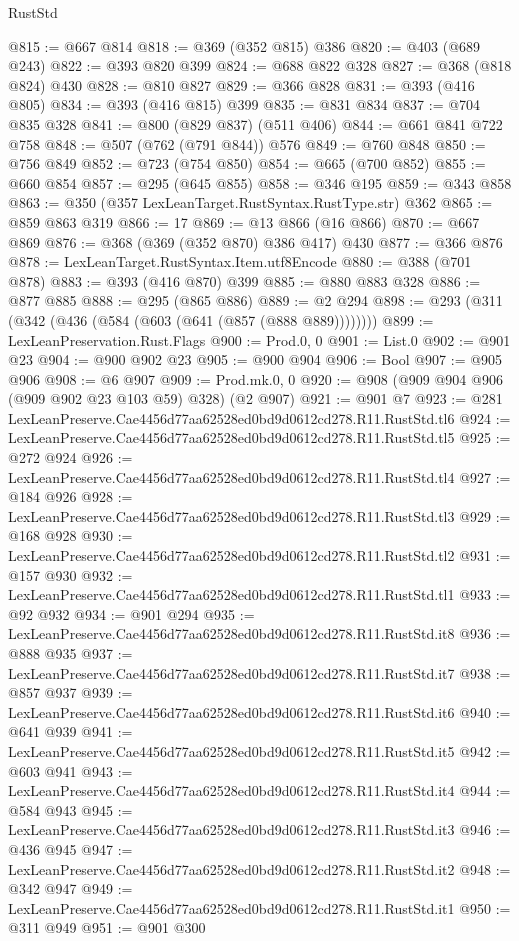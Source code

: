 \begin{lexlean}{RustStd}
\begin{coremodule}
@815 := @667 @814
@818 := @369 (@352 @815) @386
@820 := @403 (@689 @243)
@822 := @393 @820 @399
@824 := @688 @822 @328
@827 := @368 (@818 @824) @430
@828 := @810 @827
@829 := @366 @828
@831 := @393 (@416 @805)
@834 := @393 (@416 @815) @399
@835 := @831 @834
@837 := @704 @835 @328
@841 := @800 (@829 @837) (@511 @406)
@844 := @661 @841 @722 @758
@848 := @507 (@762 (@791 @844)) @576
@849 := @760 @848
@850 := @756 @849
@852 := @723 (@754 @850)
@854 := @665 (@700 @852)
@855 := @660 @854
@857 := @295 (@645 @855)
@858 := @346 @195
@859 := @343 @858
@863 := @350 (@357 LexLeanTarget.RustSyntax.RustType.str) @362
@865 := @859 @863 @319
@866 := 17
@869 := @13 @866 (@16 @866)
@870 := @667 @869
@876 := @368 (@369 (@352 @870) @386 @417) @430
@877 := @366 @876
@878 := LexLeanTarget.RustSyntax.Item.utf8Encode
@880 := @388 (@701 @878)
@883 := @393 (@416 @870) @399
@885 := @880 @883 @328
@886 := @877 @885
@888 := @295 (@865 @886)
@889 := @2 @294
@898 := @293 (@311 (@342 (@436 (@584 (@603 (@641 (@857 (@888 @889))))))))
@899 := LexLeanPreservation.Rust.Flags
@900 := Prod.{0, 0}
@901 := List.{0}
@902 := @901 @23
@904 := @900 @902 @23
@905 := @900 @904
@906 := Bool
@907 := @905 @906
@908 := @6 @907
@909 := Prod.mk.{0, 0}
@920 := @908 (@909 @904 @906 (@909 @902 @23 @103 @59) @328) (@2 @907)
@921 := @901 @7
@923 := @281 LexLeanPreserve.Cae4456d77aa62528ed0bd9d0612cd278.R11.RustStd.tl6
@924 := LexLeanPreserve.Cae4456d77aa62528ed0bd9d0612cd278.R11.RustStd.tl5
@925 := @272 @924
@926 := LexLeanPreserve.Cae4456d77aa62528ed0bd9d0612cd278.R11.RustStd.tl4
@927 := @184 @926
@928 := LexLeanPreserve.Cae4456d77aa62528ed0bd9d0612cd278.R11.RustStd.tl3
@929 := @168 @928
@930 := LexLeanPreserve.Cae4456d77aa62528ed0bd9d0612cd278.R11.RustStd.tl2
@931 := @157 @930
@932 := LexLeanPreserve.Cae4456d77aa62528ed0bd9d0612cd278.R11.RustStd.tl1
@933 := @92 @932
@934 := @901 @294
@935 := LexLeanPreserve.Cae4456d77aa62528ed0bd9d0612cd278.R11.RustStd.it8
@936 := @888 @935
@937 := LexLeanPreserve.Cae4456d77aa62528ed0bd9d0612cd278.R11.RustStd.it7
@938 := @857 @937
@939 := LexLeanPreserve.Cae4456d77aa62528ed0bd9d0612cd278.R11.RustStd.it6
@940 := @641 @939
@941 := LexLeanPreserve.Cae4456d77aa62528ed0bd9d0612cd278.R11.RustStd.it5
@942 := @603 @941
@943 := LexLeanPreserve.Cae4456d77aa62528ed0bd9d0612cd278.R11.RustStd.it4
@944 := @584 @943
@945 := LexLeanPreserve.Cae4456d77aa62528ed0bd9d0612cd278.R11.RustStd.it3
@946 := @436 @945
@947 := LexLeanPreserve.Cae4456d77aa62528ed0bd9d0612cd278.R11.RustStd.it2
@948 := @342 @947
@949 := LexLeanPreserve.Cae4456d77aa62528ed0bd9d0612cd278.R11.RustStd.it1
@950 := @311 @949
@951 := @901 @300

\end{coremodule}
\end{lexlean}
